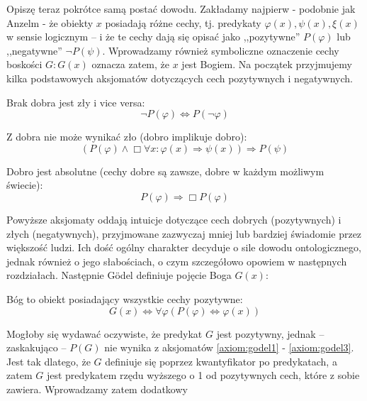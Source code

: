 \documentclass[12pt]{article}
\begin{document}
\begin{multicols}{2}
Opiszę teraz pokrótce samą postać dowodu. Zakładamy najpierw - podobnie jak Anzelm - że obiekty $x$ posiadają różne cechy, tj. predykaty $\varphi(x), \psi(x), \xi(x)$ w sensie logicznym -- i że te cechy dają się opisać jako ,,pozytywne'' $P(\varphi)$ lub ,,negatywne'' $\neg P(\psi)$. Wprowadzamy również symboliczne oznaczenie cechy boskości $G: G(x)$ oznacza zatem, że $x$ jest Bogiem. Na początek przyjmujemy kilka podstawowych aksjomatów dotyczących cech pozytywnych i negatywnych. 
\begin{axiom-g} \label{axiom:godel1}
	Brak dobra jest zły i vice versa: 
	\begin{equation*}
	\neg P(\varphi) \Leftrightarrow P(\neg \varphi)
	\end{equation*}
\end{axiom-g}
\begin{axiom-g} \label{axiom:godel2}
	Z dobra nie może wynikać zło (dobro implikuje dobro): 
	\begin{equation*}
	\left( P(\varphi) \wedge \Box \forall x: \varphi(x) \Rightarrow \psi(x) \right) \Rightarrow P(\psi)
	\end{equation*}
\end{axiom-g}
\begin{axiom-g} \label{axiom:godel3}
	Dobro jest absolutne (cechy dobre są zawsze, dobre w każdym możliwym świecie):
	\begin{equation*}
	P(\varphi) \Rightarrow \Box P(\varphi)
	\end{equation*}
\end{axiom-g}
Powyższe aksjomaty oddają intuicje dotyczące cech dobrych (pozytywnych) i złych (negatywnych), przyjmowane zazwyczaj mniej lub bardziej świadomie przez większość ludzi. Ich dość ogólny charakter decyduje o sile dowodu ontologicznego, jednak również o jego słabościach, o czym szczegółowo opowiem w następnych rozdziałach. 
Następnie Gödel definiuje pojęcie Boga $G(x)$:
\begin{definition-g} \label{def:godel1}
	Bóg to obiekt posiadający wszystkie cechy pozytywne: 
	\begin{equation*}
	G(x) \Leftrightarrow \forall \varphi \left( P(\varphi) \Leftrightarrow \varphi(x) \right)
	\end{equation*}
\end{definition-g}
Mogłoby się wydawać oczywiste, że predykat $G$ jest pozytywny, jednak -- zaskakująco -- $P(G)$ nie wynika z aksjomatów \ref{axiom:godel1} - \ref{axiom:godel3}. Jest tak dlatego, że $G$ definiuje się poprzez kwantyfikator po predykatach, a zatem $G$ jest predykatem rzędu wyższego o 1 od pozytywnych cech, które z sobie zawiera. Wprowadzamy zatem dodatkowy

\end{multicols}
\end{document}
